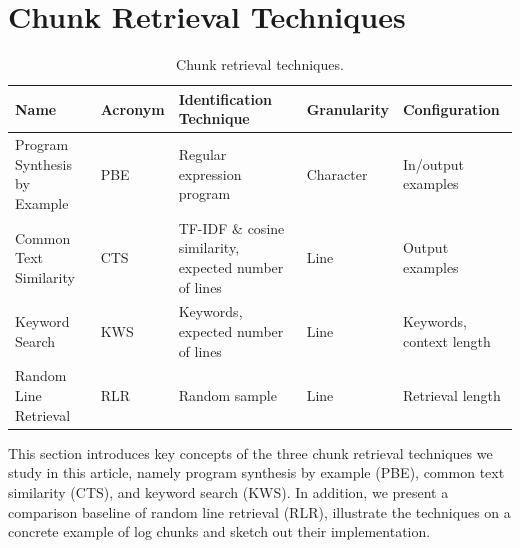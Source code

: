 
\section{Chunk Retrieval Techniques}
\label{sec:techniques}

\begin{table}[htb]
\centering
\caption{Chunk retrieval techniques.}
\begin{tabularx}{\textwidth}{@{}llXll@{}}
\toprule
Name			     & Acronym & Identification Technique
& Granularity & Configuration \\
\midrule
Program Synthesis by Example & PBE     & Regular expression program
& Character   & In/output examples	\\
Common Text Similarity	     & CTS     & TF-IDF \& cosine similarity,
expected number of lines & Line        & Output examples	   \\
Keyword Search		     & KWS     & Keywords, expected number of
lines			 & Line        & Keywords, context length  \\
Random Line Retrieval	     & RLR     & Random sample
& Line	      & Retrieval length	  \\
\bottomrule
\end{tabularx}
\label{tab:ctr}
\end{table}


This section introduces key concepts of the three chunk retrieval
techniques we study in this article, namely program synthesis by
example (PBE), common text similarity (CTS), and keyword search (KWS).
In addition, we present a comparison baseline of random line
retrieval (RLR), illustrate the techniques on a concrete example
of log chunks and sketch out their implementation.

